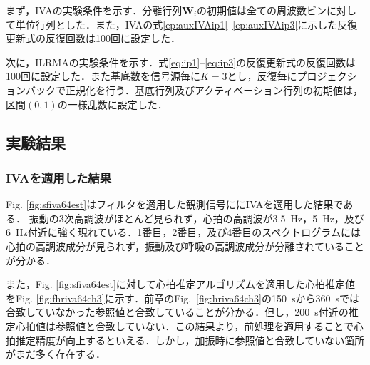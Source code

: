 \documentclass[10.5pt]{jarticle}
\begin{document}
{まず，IVAの実験条件を示す．分離行列$\bm{W}_{i}$の初期値は全ての周波数ビンに対して単位行列とした．また，IVAの式\eqref{ep:auxIVAip1}--\eqref{ep:auxIVAip3}に示した反復更新式の反復回数は100回に設定した．

次に，ILRMAの実験条件を示す．式\eqref{eq:ip1}--\eqref{eq:ip3}の反復更新式の反復回数は100回に設定した．また基底数を信号源毎に$K=3$とし，反復毎にプロジェクションバックで正規化を行う．基底行列及びアクティベーション行列の初期値は，区間$(0,1)$の一様乱数に設定した．

\subsection{実験結果}
\subsubsection{IVAを適用した結果}
\hspace{1.0em}Fig. \ref{fig:sfiva64est}はフィルタを適用した観測信号ににIVAを適用した結果である．
振動の3次高調波がほとんど見られず，心拍の高調波が3.5~Hz，5~Hz，及び6~Hz付近に強く現れている．1番目，2番目，及び4番目のスペクトログラムには心拍の高調波成分が見られず，振動及び呼吸の高調波成分が分離されていることが分かる．}

また，Fig. \ref{fig:sfiva64est}に対して心拍推定アルゴリズムを適用した心拍推定値をFig. \ref{fig:fhriva64ch3}に示す．前章のFig.~\ref{fig:hriva64ch3}の150~sから360~sでは合致していなかった参照値と合致していることが分かる．但し，200~s付近の推定心拍値は参照値と合致していない．この結果より，前処理を適用することで心拍推定精度が向上するといえる．しかし，加振時に参照値と合致していない箇所がまだ多く存在する．
\end{document}
